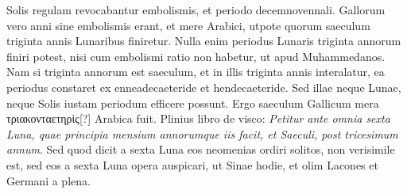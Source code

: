 Solis regulam revocabantur embolismis, et periodo decemnovennali.
Gallorum vero anni sine embolismis erant, et mere Arabici,
utpote quorum saeculum triginta annis Lunaribus finiretur.
Nulla
enim periodus Lunaris triginta annorum finiri potest, nisi cum embolismi
ratio non habetur, ut apud Muhammedanos.
Nam si triginta
annorum est saeculum, et in illis triginta annis interalatur, ea
periodus constaret ex enneadecaeteride et hendecaeteride.
Sed illae
neque Lunae, neque Solis iustam periodum efficere possunt.
Ergo saeculum
Gallicum mera \textgreek{τριακονταετηρὶς[?]} Arabica fuit.
Plinius  libro
de visco: \textit{Petitur ante omnia sexta Luna,
 quae principia mensium annorumque
iis facit, et Saeculi, post tricesimum annum}.
Sed quod dicit
a sexta Luna eos neomenias ordiri solitos, non verisimile est, sed
eos a sexta Luna opera auspicari, ut Sinae hodie, et olim Lacones
et Germani a plena.
%
